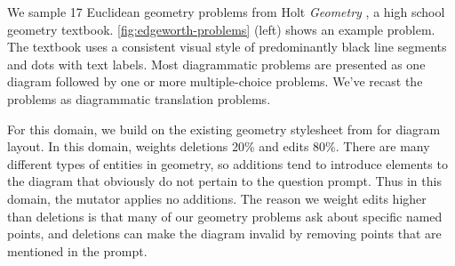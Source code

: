 We sample 17 Euclidean geometry problems from Holt \textit{Geometry} \cite{burger2007holt}, a high school geometry textbook. \cref{fig:edgeworth-problems} (left) shows an example problem. The textbook uses a consistent visual style of predominantly black line segments and dots with text labels. Most diagrammatic problems are presented as one diagram followed by one or more multiple-choice problems. We've recast the problems as diagrammatic translation problems.

For this domain, we build on the existing geometry stylesheet from \Penrose \cite[Section~5.3]{penrose} for diagram layout. In this domain, \Edgeworth weights deletions 20\% and edits 80\%. There are many different types of entities in geometry, so additions tend to introduce elements to the diagram that obviously do not pertain to the question prompt. Thus in this domain, the \Edgeworth mutator applies no additions. The reason we weight edits higher than deletions is that many of our geometry problems ask about specific named points, and deletions can make the diagram invalid by removing points that are mentioned in the prompt.



